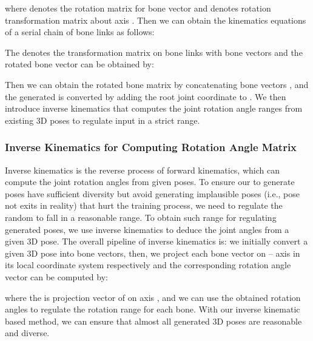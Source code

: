 \documentclass[runningheads]{llncs}
\begin{document}
where  denotes the rotation matrix for bone vector  and  denotes rotation transformation matrix about axis . Then we can obtain the kinematics equations of a serial chain of  bone links as follows:



The  denotes the transformation matrix on bone links with  bone vectors and the rotated bone vector  can be obtained by:



Then we can obtain the rotated bone matrix  by concatenating  bone vectors , and the generated  is converted by adding the root joint coordinate to . 
We then introduce inverse kinematics that computes the joint rotation angle ranges from existing 3D poses to regulate input  in a strict range. 

\subsubsection{Inverse Kinematics for Computing Rotation Angle Matrix} 
Inverse kinematics is the reverse process of forward kinematics, which can compute the joint rotation angles from given poses. 
To ensure our  to generate poses have sufficient diversity but avoid generating implausible poses (i.e., pose not exits in reality) that hurt the training process, we need to regulate the random  to fall in a reasonable range. To obtain such range for regulating generated poses, we use inverse kinematics to deduce the joint angles from a given 3D pose. 
The overall pipeline of inverse kinematics is: we initially convert a given 3D pose into bone vectors, then, we project each bone vector on -- axis in its local coordinate system respectively and the corresponding rotation angle vector  can be computed by:


where the  is projection vector of  on axis , and we can use the obtained rotation angles to regulate the rotation range for each bone. 
With our inverse kinematic based method, we can ensure that almost all generated 3D poses are reasonable and diverse.
\end{document}
